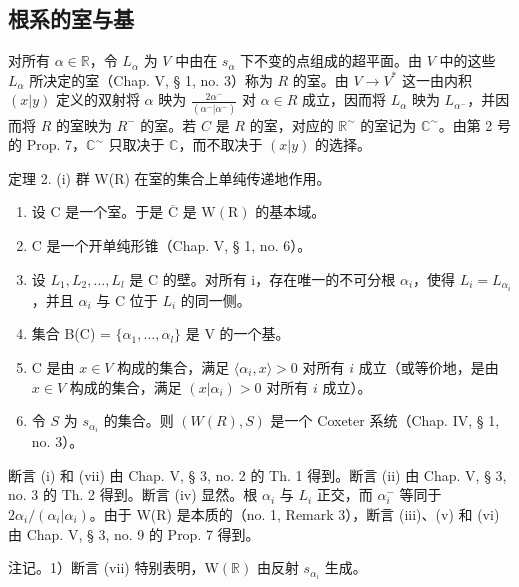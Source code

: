 \subsection{根系的室与基}

对所有 \(\alpha \in \mathbb{R}\)，令 \(L_{\alpha}\) 为 \(V\) 中由在 \(s_{\alpha}\) 下不变的点组成的超平面。由 \(V\) 中的这些 \(L_{\alpha}\) 所决定的室（Chap. V, § 1, no. 3）称为 \(R\) 的室。由 \(V \to V^{*}\) 这一由内积 \((x|y)\) 定义的双射将 \(\alpha\) 映为 \(\frac{2\alpha^{-}}{(\alpha^{-}|\alpha^{-})}\) 对 \(\alpha \in R\) 成立，因而将 \(L_{\alpha}\) 映为 \(L_{\alpha^{-}}\)，并因而将 \(R\) 的室映为 \(R^{-}\) 的室。若 \(C\) 是 \(R\) 的室，对应的 \(\mathbb{R}^{\sim}\) 的室记为 \(\mathbb{C}^{\sim}\)。由第 2 号的 Prop. 7，\(\mathbb{C}^{\sim}\) 只取决于 \(\mathbb{C}\)，而不取决于 \((x|y)\) 的选择。

定理 2. (i) 群 W(R) 在室的集合上单纯传递地作用。

\begin{enumerate}
\def\labelenumi{(\roman{enumi})}
\setcounter{enumi}{1}
\item
  设 \(\mathrm{C}\) 是一个室。于是 \(\overline{\mathrm{C}}\) 是 \(\mathrm{W}(\mathrm{R})\) 的基本域。
\item
  C 是一个开单纯形锥（Chap. V, § 1, no. 6）。
\item
  设 \(L_{1}, L_{2}, \ldots, L_{l}\) 是 C 的壁。对所有 i，存在唯一的不可分根 \(\alpha_{i}\)，使得 \(L_{i} = L_{\alpha_{i}}\)，并且 \(\alpha_{i}\) 与 C 位于 \(L_{i}\) 的同一侧。
\item
  集合 B(C) = \(\{\alpha_{1},\ldots,\alpha_{l}\}\) 是 V 的一个基。
\item
  C 是由 \(x \in V\) 构成的集合，满足 \(\langle \alpha_i, x \rangle > 0\) 对所有 \(i\) 成立（或等价地，是由 \(x \in V\) 构成的集合，满足 \((x|\alpha_i) > 0\) 对所有 \(i\) 成立）。
\item
  令 \(S\) 为 \(s_{\alpha_i}\) 的集合。则 \((W(R), S)\) 是一个 Coxeter 系统（Chap. IV, § 1, no. 3）。
\end{enumerate}

断言 (i) 和 (vii) 由 Chap. V, § 3, no. 2 的 Th. 1 得到。断言 (ii) 由 Chap. V, § 3, no. 3 的 Th. 2 得到。断言 (iv) 显然。根 \(\alpha_{i}\) 与 \(L_{i}\) 正交，而 \(\alpha_{i}^{-}\) 等同于 \(2\alpha_{i}/(\alpha_{i}|\alpha_{i})\)。由于 W(R) 是本质的（no. 1, Remark 3），断言 (iii)、(v) 和 (vi) 由 Chap. V, § 3, no. 9 的 Prop. 7 得到。

注记。1）断言 (vii) 特别表明，\(\mathrm{W}(\mathbb{R})\) 由反射 \(s_{\alpha_i}\) 生成。

